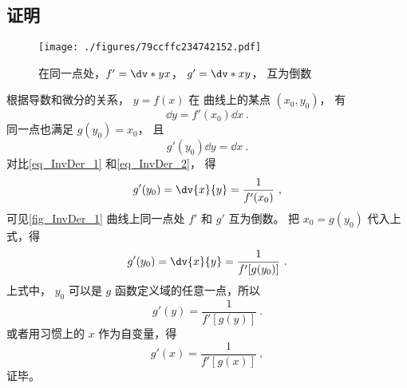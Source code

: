 \subsection{证明}
\begin{figure}[ht]
\centering
\texttt{[image: ./figures/79ccffc234742152.pdf]}
\caption{在同一点处，$f'=\dv*{y}{x}$， $g'=\dv*{x}{y}$， 互为倒数}\label{fig_InvDer_1}
\end{figure}
根据导数和微分的关系， $y = f(x)$ 在 曲线上的某点 $(x_0, y_0)$， 有
 \begin{equation}\label{eq_InvDer_1}
\dd{y} = f'(x_0) \dd{x}~.
\end{equation}
同一点也满足 $g(y_0) = x_0$， 且
 \begin{equation}\label{eq_InvDer_2}
g'(y_0)\dd{y} = \dd{x}~.
\end{equation}
对比\autoref{eq_InvDer_1} 和\autoref{eq_InvDer_2}， 得
\begin{equation}
g'(y_0) = \dv{x}{y} = \frac{1}{f'(x_0)}~,
\end{equation}
可见\autoref{fig_InvDer_1} 曲线上同一点处 $f'$ 和 $g'$ 互为倒数。 把 ${x_0} = g(y_0)$ 代入上式，得
\begin{equation}
g'(y_0) = \dv{x}{y} = \frac{1}{f'[g(y_0)]}~.
\end{equation} 
上式中， $y_0$ 可以是 $g$ 函数定义域的任意一点，所以
\begin{equation}
g'(y) = \frac{1}{f'[g(y)]}~.
\end{equation} 
或者用习惯上的 $x$ 作为自变量，得
\begin{equation}
g'(x) = \frac{1}{f'[g(x)]}~,
\end{equation}
证毕。
















